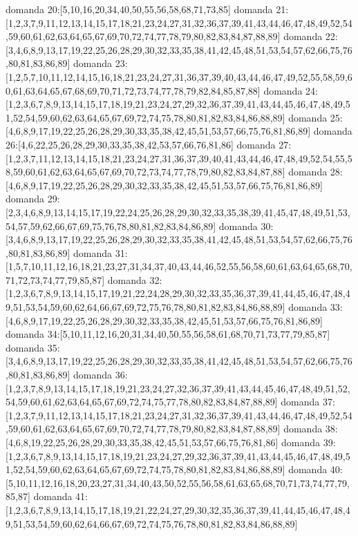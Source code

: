 domanda 20:[5,10,16,20,34,40,50,55,56,58,68,71,73,85]
domanda 21:[1,2,3,7,9,11,12,13,14,15,17,18,21,23,24,27,31,32,36,37,39,41,43,44,46,47,48,49,52,54,59,60,61,62,63,64,65,67,69,70,72,74,77,78,79,80,82,83,84,87,88,89]
domanda 22:[3,4,6,8,9,13,17,19,22,25,26,28,29,30,32,33,35,38,41,42,45,48,51,53,54,57,62,66,75,76,80,81,83,86,89]
domanda 23:[1,2,5,7,10,11,12,14,15,16,18,21,23,24,27,31,36,37,39,40,43,44,46,47,49,52,55,58,59,60,61,63,64,65,67,68,69,70,71,72,73,74,77,78,79,82,84,85,87,88]
domanda 24:[1,2,3,6,7,8,9,13,14,15,17,18,19,21,23,24,27,29,32,36,37,39,41,43,44,45,46,47,48,49,51,52,54,59,60,62,63,64,65,67,69,72,74,75,78,80,81,82,83,84,86,88,89]
domanda 25:[4,6,8,9,17,19,22,25,26,28,29,30,33,35,38,42,45,51,53,57,66,75,76,81,86,89]
domanda 26:[4,6,22,25,26,28,29,30,33,35,38,42,53,57,66,76,81,86]
domanda 27:[1,2,3,7,11,12,13,14,15,18,21,23,24,27,31,36,37,39,40,41,43,44,46,47,48,49,52,54,55,58,59,60,61,62,63,64,65,67,69,70,72,73,74,77,78,79,80,82,83,84,87,88]
domanda 28:[4,6,8,9,17,19,22,25,26,28,29,30,32,33,35,38,42,45,51,53,57,66,75,76,81,86,89]
domanda 29:[2,3,4,6,8,9,13,14,15,17,19,22,24,25,26,28,29,30,32,33,35,38,39,41,45,47,48,49,51,53,54,57,59,62,66,67,69,75,76,78,80,81,82,83,84,86,89]
domanda 30:[3,4,6,8,9,13,17,19,22,25,26,28,29,30,32,33,35,38,41,42,45,48,51,53,54,57,62,66,75,76,80,81,83,86,89]
domanda 31:[1,5,7,10,11,12,16,18,21,23,27,31,34,37,40,43,44,46,52,55,56,58,60,61,63,64,65,68,70,71,72,73,74,77,79,85,87]
domanda 32:[1,2,3,6,7,8,9,13,14,15,17,19,21,22,24,28,29,30,32,33,35,36,37,39,41,44,45,46,47,48,49,51,53,54,59,60,62,64,66,67,69,72,75,76,78,80,81,82,83,84,86,88,89]
domanda 33:[4,6,8,9,17,19,22,25,26,28,29,30,32,33,35,38,42,45,51,53,57,66,75,76,81,86,89]
domanda 34:[5,10,11,12,16,20,31,34,40,50,55,56,58,61,68,70,71,73,77,79,85,87]
domanda 35:[3,4,6,8,9,13,17,19,22,25,26,28,29,30,32,33,35,38,41,42,45,48,51,53,54,57,62,66,75,76,80,81,83,86,89]
domanda 36:[1,2,3,7,8,9,13,14,15,17,18,19,21,23,24,27,32,36,37,39,41,43,44,45,46,47,48,49,51,52,54,59,60,61,62,63,64,65,67,69,72,74,75,77,78,80,82,83,84,87,88,89]
domanda 37:[1,2,3,7,9,11,12,13,14,15,17,18,21,23,24,27,31,32,36,37,39,41,43,44,46,47,48,49,52,54,59,60,61,62,63,64,65,67,69,70,72,74,77,78,79,80,82,83,84,87,88,89]
domanda 38:[4,6,8,19,22,25,26,28,29,30,33,35,38,42,45,51,53,57,66,75,76,81,86]
domanda 39:[1,2,3,6,7,8,9,13,14,15,17,18,19,21,23,24,27,29,32,36,37,39,41,43,44,45,46,47,48,49,51,52,54,59,60,62,63,64,65,67,69,72,74,75,78,80,81,82,83,84,86,88,89]
domanda 40:[5,10,11,12,16,18,20,23,27,31,34,40,43,50,52,55,56,58,61,63,65,68,70,71,73,74,77,79,85,87]
domanda 41:[1,2,3,6,7,8,9,13,14,15,17,18,19,21,22,24,27,29,30,32,35,36,37,39,41,44,45,46,47,48,49,51,53,54,59,60,62,64,66,67,69,72,74,75,76,78,80,81,82,83,84,86,88,89]
